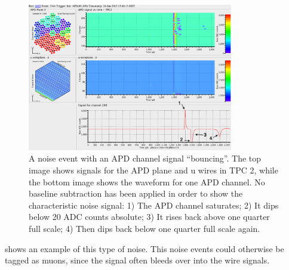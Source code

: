 \documentclass[herrin-thesis.tex]{subfiles}
\begin{document}
\begin{figure}
\centering
\includegraphics[width=0.8\textwidth]{./plots/noise_eventdisplay_run_4685_ev_3344_annotated.png}
\caption[APD ``bouncing'' noise]{A noise event with an APD channel signal ``bouncing''. The top image shows signals for the APD plane and u wires in TPC 2, while the bottom image shows the waveform for one APD channel. No baseline subtraction has been applied in order to show the characteristic noise signal: 1) The APD channel saturates; 2) It dips below 20 ADC counts absolute; 3) It rises back above one quarter full scale; 4) Then dips back below one quarter full scale again.}
\label{fig:noise_apd_bounce}
\end{figure}

 shows an example of this type of noise. This noise events could otherwise be tagged as muons, since the signal often bleeds over into the wire signals.
\end{document}
